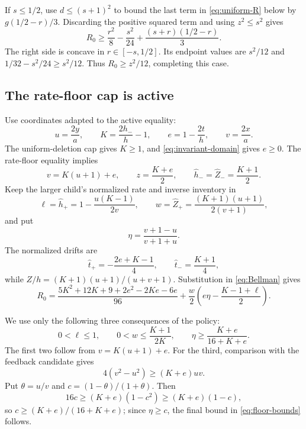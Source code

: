\documentclass[11pt]{article}
\numberwithin{equation}{section}
\theoremstyle{remark}
\begin{document}
If \(s\le1/2\), use \(d\le(s+1)^2\) to bound the last term in
\eqref{eq:uniform-R} below by \(g(1/2-r)/3\). Discarding the positive
squared term and using \(z^2\le s^2\) gives
\[
R_0\ge
\frac{r^2}{8}-\frac{s^2}{24}
+\frac{(s+r)(1/2-r)}3.
\]
The right side is concave in \(r\in[-s,1/2]\). Its endpoint values are
\(s^2/12\) and \(1/32-s^2/24\ge s^2/12\). Thus
\(R_0\ge z^2/12\), completing this case.

\subsection{The rate-floor cap is active}

Use coordinates adapted to the active equality:
\begin{equation}\label{eq:floor-coordinates}
u=\frac{2y}{a},\qquad
K=\frac{2h_-}{h}-1,\qquad
e=1-\frac{2t}{h},\qquad
v=\frac{2x}{a}.
\end{equation}
The uniform-deletion cap gives \(K\ge1\), and
\eqref{eq:invariant-domain} gives \(e\ge0\). The rate-floor equality
implies
\begin{equation}\label{eq:floor-identities}
v=K(u+1)+e,\qquad
z=\frac{K+e}{2},\qquad
\widehat h_- =\widehat Z_- =\frac{K+1}{2}.
\end{equation}
Keep the larger child's normalized rate and inverse inventory in
\[
\ell=\widehat h_+
=1-\frac{u(K-1)}{2v},\qquad
w=\widehat Z_+
=\frac{(K+1)(u+1)}{2(v+1)},
\]
and put
\[
\eta=\frac{v+1-u}{v+1+u}.
\]
The normalized drifts are
\[
\widehat t_+=-\frac{2e+K-1}{4},\qquad
\widehat t_- =\frac{K+1}{4},
\]
while \(Z/h=(K+1)(u+1)/(u+v+1)\). Substitution in
\eqref{eq:Bellman} gives
\begin{equation}\label{eq:floor-R}
R_0=
\frac{5K^2+12K+9+2e^2-2Ke-6e}{96}
+\frac w2\left(e\eta-\frac{K-1+\ell}{2}\right).
\end{equation}

We use only the following three consequences of the policy:
\begin{equation}\label{eq:floor-bounds}
0<\ell\le1,\qquad
0<w\le\frac{K+1}{2K},\qquad
\eta\ge\frac{K+e}{16+K+e}.
\end{equation}
The first two follow from \(v=K(u+1)+e\). For the third, comparison with
the feedback candidate gives
\[
4(v^2-u^2)\ge(K+e)uv.
\]
Put \(\theta=u/v\) and \(c=(1-\theta)/(1+\theta)\). Then
\[
16c\ge(K+e)(1-c^2)\ge(K+e)(1-c),
\]
so \(c\ge(K+e)/(16+K+e)\); since \(\eta\ge c\), the final bound in
\eqref{eq:floor-bounds} follows.
\end{document}
